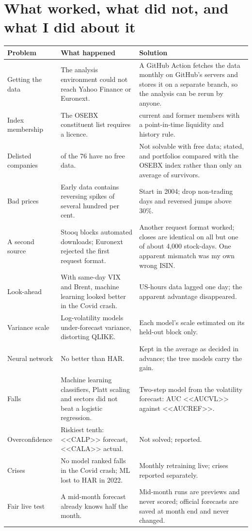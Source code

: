 \documentclass[11pt,a4paper]{article}
\begin{document}
\section{What worked, what did not, and what I did about it}
\label{sec:lessons}
{\small\noindent\begin{tabularx}{\linewidth}{>{\raggedright\arraybackslash}p{2.6cm}>{\raggedright\arraybackslash}X>{\raggedright\arraybackslash}X}\toprule
Problem & What happened & Solution \\\midrule
Getting the data & The analysis environment could not reach Yahoo Finance or Euronext. & A GitHub Action fetches the data monthly on GitHub's servers and stores it on a separate branch, so the analysis can be rerun by anyone. \\
Index membership & The OSEBX constituent list requires a licence. & 76 current and former members with a point-in-time liquidity and history rule. \\
Delisted companies & 12 of the 76 have no free data. & Not solvable with free data; stated, and portfolios compared with the OSEBX index rather than only an average of survivors. \\
Bad prices & Early data contains reversing spikes of several hundred per cent. & Start in 2004; drop non-trading days and reversed jumps above 30\%. \\
A second source & Stooq blocks automated downloads; Euronext rejected the first request format. & Another request format worked; closes are identical on all but one of about 4,000 stock-days. One apparent mismatch was my own wrong ISIN. \\
Look-ahead & With same-day VIX and Brent, machine learning looked better in the Covid crash. & US-hours data lagged one day; the apparent advantage disappeared. \\
Variance scale & Log-volatility models under-forecast variance, distorting QLIKE. & Each model's scale estimated on its held-out block only. \\
Neural network & No better than HAR. & Kept in the average as decided in advance; the tree models carry the gain. \\
Falls & Machine learning classifiers, Platt scaling and sectors did not beat a logistic regression. & Two-step model from the volatility forecast: AUC <<AUCVL>> against <<AUCREF>>. \\
Overconfidence & Riskiest tenth: <<CALP>> forecast, <<CALA>> actual. & Not solved; reported. \\
Crises & No model ranked falls in the Covid crash; ML lost to HAR in 2022. & Monthly retraining live; crises reported separately. \\
Fair live test & A mid-month forecast already knows half the month. & Mid-month runs are previews and never scored; official forecasts are saved at month end and never changed. \\
\bottomrule\end{tabularx}}
\end{document}
